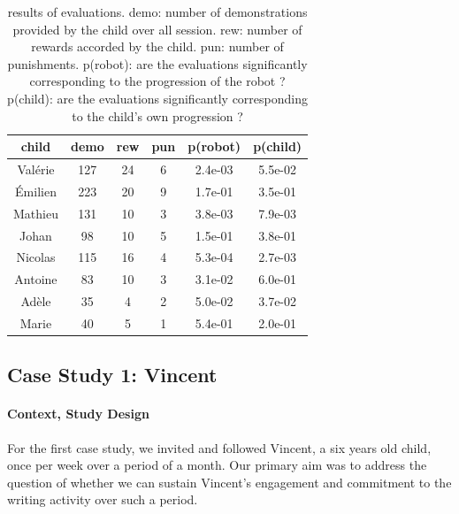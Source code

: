 \documentclass{article}
\begin{document}
\begin{table}
    \centering
    \begin{tabular}{|c|c|c|c|c|c|}
        \hline
        child & demo & rew & pun & p(robot) & p(child)\\ \hline
        Valérie & 127 & 24 & 6 & 2.4e-03 & 5.5e-02\\ \hline
        Émilien & 223 & 20 & 9 & 1.7e-01 & 3.5e-01\\ \hline
        Mathieu & 131 & 10 & 3 & 3.8e-03 & 7.9e-03\\ \hline
        Johan & 98 & 10 & 5 &  1.5e-01 & 3.8e-01\\ \hline
        Nicolas & 115 & 16 & 4 & 5.3e-04 & 2.7e-03\\ \hline
        Antoine & 83 & 10 & 3 & 3.1e-02 & 6.0e-01\\ \hline
        Adèle & 35 & 4 & 2 & 5.0e-02 & 3.7e-02\\ \hline
        Marie & 40 & 5 & 1 &  5.4e-01 & 2.0e-01\\ \hline
    \end{tabular}
    \caption{\small results of evaluations. demo: number of demonstrations provided by
        the child over all session. rew: number of rewards accorded by
        the child. pun: number of punishments. p(robot): are the evaluations
        significantly corresponding to the progression of the robot ? p(child): are the
        evaluations significantly corresponding to the child's own
progression ?}
    \label{table:scores}
\end{table}

\subsection{Case Study 1: Vincent}

\paragraph{Context, Study Design}

For the first case study, we invited and followed Vincent, a six years old
child, once per week over a period of a month. Our primary aim was to address the
question of whether we can sustain Vincent's engagement and commitment to the
writing activity over such a period.
\end{document}
